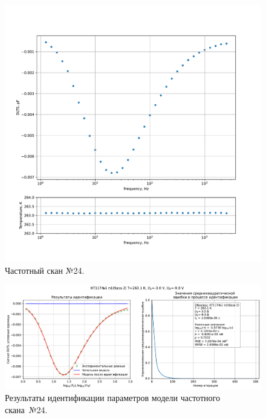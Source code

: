 \begin{figure}[!ht]
    \centering
    \includegraphics[width=1\textwidth]{../plots/КТ117№1_п1(база 2)_2500Гц-1Гц_1пФ_-10С_-3В-9В_100мВ_20мкс_шаг_0,1.pdf}
    \caption{Частотный скан №24.}
    \label{pic:frequency_scan_24}
\end{figure}

\begin{figure}[!ht]
    \centering
    \includegraphics[width=1\textwidth]{../plots/КТ117№1_п1(база 2)_2500Гц-1Гц_1пФ_-10С_-3В-9В_100мВ_20мкс_шаг_0,1_model.pdf}
    \caption{Результаты идентификации параметров модели частотного скана~№24.}
    \label{pic:frequency_scan_model24}
\end{figure}

\pagebreak


